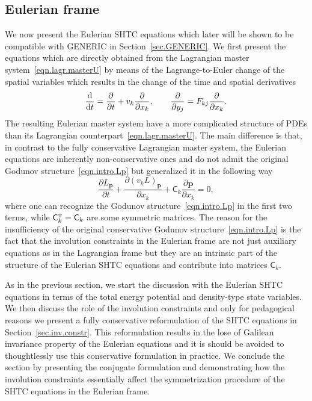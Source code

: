 \documentclass[twoside]{article}
\newcommand{\pp}{{\boldsymbol{p}}}
\newcommand{\pd}{\partial}
\newcommand{\rmd}{{\rm d}}
\newcommand{\transpose}{{\rm {\mathsmaller T}}}
\begin{document}
\subsection{Eulerian frame}

We now present the Eulerian SHTC equations which later will be shown to be 
compatible with GENERIC in Section~\ref{sec.GENERIC}. We first 
present the equations which are directly obtained from the Lagrangian master 
system~\eqref{eqn.lagr.masterU} by means of the  Lagrange-to-Euler change of 
the spatial variables which results in the change of the time and 
spatial derivatives
\begin{equation}\label{eqn.L2E.change}
\frac{\rmd }{\rmd t} = \frac{\pd }{\pd t} + v_k\frac{\pd }{\pd x_k}, \qquad 
\frac{\pd}{\pd y_j} = F_{kj}\frac{\pd}{\pd x_k}.
\end{equation}
The resulting Eulerian master system have a more complicated structure of 
PDEs than its Lagrangian counterpart~\eqref{eqn.lagr.masterU}. The main 
difference is that, in contrast to the fully conservative Lagrangian master 
system, the Eulerian 
equations are inherently non-conservative ones and do not admit the original 
Godunov structure~\eqref{eqn.intro.Lp} but generalized it in the following way
\begin{equation}\label{eqn.Lp.euler}
\frac{\pd L_{\pp}}{\pd t} + \frac{\pd (v_k L)_{\pp}}{\pd x_k} + \mathsf{C}_k 
\frac{\pd \pp}{\pd x_k} = 0,
\end{equation}
where one can recognize 
the Godunov structure~\eqref{eqn.intro.Lp} in the first two terms, while $ 
\mathsf{C}_k^\transpose = \mathsf{C}_k $ are some symmetric matrices. 
The reason for the insufficiency of the original conservative Godunov 
structure~\eqref{eqn.intro.Lp} is the fact that the involution constraints in 
the Eulerian frame are not 
just auxiliary equations as in the Lagrangian frame but they are an 
intrinsic part of the structure of the Eulerian SHTC equations and contribute 
into matrices $ \mathsf{C}_k $.  

As in the previous section, we start the discussion with the Eulerian SHTC 
equations in terms of the total energy potential and density-type state 
variables. We then 
discuss the role of the involution constraints and only for pedagogical reasons 
we present a fully conservative reformulation of the SHTC equations in 
Section~\ref{sec.inv.constr}. This reformulation results in the lose of 
Galilean invariance property of the Eulerian equations and it is should be 
avoided to thoughtlessly use this conservative formulation in practice. We 
conclude the section by presenting the conjugate 
formulation and demonstrating how the involution constraints essentially affect 
the symmetrization procedure of the SHTC equations in the Eulerian frame.
\end{document}
